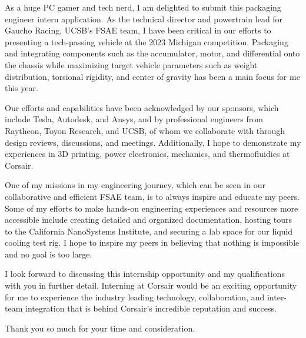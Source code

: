 \documentclass[11pt, letterpaper]{awesome-cv} %
\begin{document}
\makecvheader %

\makelettertitle %


\begin{cvletter}

As a huge PC gamer and tech nerd, I am delighted to submit this packaging engineer intern application. As the technical director and powertrain lead for Gaucho Racing, UCSB's FSAE team, I have been critical in our efforts to presenting a tech-passing vehicle at the 2023 Michigan competition. Packaging and integrating components such as the accumulator, motor, and differential onto the chassis while maximizing target vehicle parameters such as weight distribution, torsional rigidity, and center of gravity has been a main focus for me this year. 


Our efforts and capabilities have been acknowledged by our sponsors, which include Tesla, Autodesk, and Ansys, and by professional engineers from Raytheon, Toyon Research, and UCSB, of whom we collaborate with through design reviews, discussions, and meetings. Additionally, I hope to demonstrate my experiences in 3D printing, power electronics, mechanics, and thermofluidics at Corsair. 

One of my missions in my engineering journey, which can be seen in our collaborative and efficient FSAE team, is to always inspire and educate my peers. Some of my efforts to make hands-on engineering experiences and resources more accessible include creating detailed and organized documentation, hosting tours to the California NanoSystems Institute, and securing a lab space for our liquid cooling test rig. I hope to inspire my peers in believing that nothing is impossible and no goal is too large.

I look forward to discussing this internship opportunity and my qualifications with you in further detail. Interning at Corsair would be an exciting opportunity for me to experience the industry leading technology, collaboration, and inter-team integration that is behind Corsair's incredible reputation and success. 

Thank you so much for your time and consideration.



\end{cvletter}


\makeletterclosing %
\end{document}

